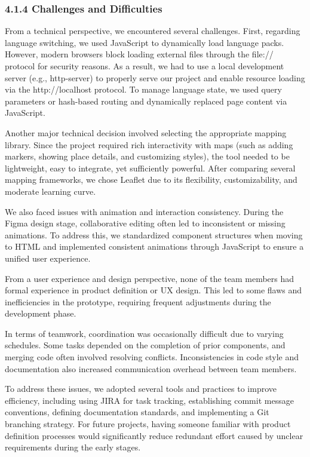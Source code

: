 \subsubsection*{4.1.4 Challenges and Difficulties}

From a technical perspective, we encountered several challenges. First, regarding language switching, we used JavaScript to dynamically load language packs. However, modern browsers block loading external files through the file:// protocol for security reasons. As a result, we had to use a local development server (e.g., http-server) to properly serve our project and enable resource loading via the http://localhost protocol. To manage language state, we used query parameters or hash-based routing and dynamically replaced page content via JavaScript.

Another major technical decision involved selecting the appropriate mapping library. Since the project required rich interactivity with maps (such as adding markers, showing place details, and customizing styles), the tool needed to be lightweight, easy to integrate, yet sufficiently powerful. After comparing several mapping frameworks, we chose Leaflet due to its flexibility, customizability, and moderate learning curve.

We also faced issues with animation and interaction consistency. During the Figma design stage, collaborative editing often led to inconsistent or missing animations. To address this, we standardized component structures when moving to HTML and implemented consistent animations through JavaScript to ensure a unified user experience.

From a user experience and design perspective, none of the team members had formal experience in product definition or UX design. This led to some flaws and inefficiencies in the prototype, requiring frequent adjustments during the development phase.

In terms of teamwork, coordination was occasionally difficult due to varying schedules. Some tasks depended on the completion of prior components, and merging code often involved resolving conflicts. Inconsistencies in code style and documentation also increased communication overhead between team members.

To address these issues, we adopted several tools and practices to improve efficiency, including using JIRA for task tracking, establishing commit message conventions, defining documentation standards, and implementing a Git branching strategy. For future projects, having someone familiar with product definition processes would significantly reduce redundant effort caused by unclear requirements during the early stages.
